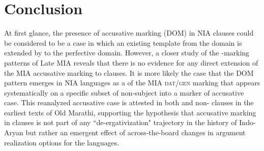 \documentclass[output=paper,
modfonts
]{LSP/langsci}
\begin{document}
 \section{Conclusion}
At first glance, the presence of accusative marking (DOM)  in NIA  clauses could  be considered to be a case in  which  an existing template from the  domain is extended by  to the perfective  domain. However, a closer study of the -marking patterns of Late MIA reveals that there is no evidence for any direct  extension of the MIA accusative marking to  clauses. It is more likely the case that the DOM pattern emerges in NIA languages as a  of the MIA \textsc{dat/gen} marking that appears systematically  on a specific  subset of  non-subject  into a marker of  accusative case. This reanalyzed accusative case is attested in  both  and non- clauses in the earliest texts of Old Marathi,  supporting the hypothesis that accusative marking in  clauses  is not part of any ``de-ergativization" trajectory 
 in the history of Indo-Aryan  but rather an emergent effect of across-the-board changes in argument realization options for the languages. 
 



\nocite{anderson77, moravcsik1978, condoravdideo14, deo2012, coonpreminger, dixon79, dixon94, plank79ed, delancey1981, tsunoda1985, andersen86, peterson98, pischel00, bubenik98, bubenik96, bloch65, vale48, masica91, declercq2010, comrie78, anderson2004}
\end{document}
